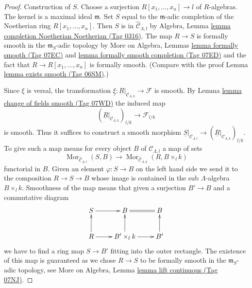 \documentclass{amsart}
\theoremstyle{plain}
\theoremstyle{definition}
\theoremstyle{remark}
\numberwithin{equation}{subsection}
\def\Mor{\mathop{\mathrm{Mor}}\nolimits}
\begin{document}
\begin{proof}
Construction of $S$. Choose a surjection $R[x_1, \ldots, x_n] \to l$
of $R$-algebras. The kernel is a maximal ideal $\mathfrak m$.
Set $S$ equal to the $\mathfrak m$-adic completion of the Noetherian ring
$R[x_1, \ldots, x_n]$. Then $S$ is in $\widehat{\mathcal{C}}_{\Lambda, l}$
by Algebra, Lemma \href{https://stacks.math.columbia.edu/tag/0316}{lemma completion Noetherian Noetherian (Tag 0316)}.
The map $R \to S$ is formally smooth in the $\mathfrak m_S$-adic topology by
More on Algebra, Lemmas
\href{https://stacks.math.columbia.edu/tag/07EC}{lemma formally smooth (Tag 07EC)} and
\href{https://stacks.math.columbia.edu/tag/07ED}{lemma formally smooth completion (Tag 07ED)}
and the fact that $R \to R[x_1, \ldots, x_n]$ is formally smooth.
(Compare with the proof Lemma \href{https://stacks.math.columbia.edu/tag/06SM}{lemma exists smooth (Tag 06SM)}.)

\medskip\noindent
Since $\xi$ is versal, the transformation
$\underline{\xi} : \underline{R}|_{\mathcal{C}_{\Lambda, k}} \to \mathcal{F}$
is smooth. By Lemma \href{https://stacks.math.columbia.edu/tag/07WD}{lemma change of fields smooth (Tag 07WD)} the induced map
$$
(\underline{R}|_{\mathcal{C}_{\Lambda, k}})_{l/k}
\longrightarrow
\mathcal{F}_{l/k}
$$
is smooth. Thus it suffices to construct a smooth morphism
$\underline{S}|_{\mathcal{C}_{\Lambda, l}} \to
(\underline{R}|_{\mathcal{C}_{\Lambda, k}})_{l/k}$.
To give such a map means for every object $B$ of $\mathcal{C}_{\Lambda, l}$
a map of sets
$$
\Mor_{\widehat{\mathcal{C}}_{\Lambda, l}}(S, B)
\longrightarrow
\Mor_{\widehat{\mathcal{C}}_{\Lambda, k}}(R, B \times_l k)
$$
functorial in $B$. Given an element $\varphi : S \to B$
on the left hand side we send it to the composition $R \to S \to B$
whose image is contained in the sub $\Lambda$-algebra $B \times_l k$.
Smoothness of the map means that given a surjection
$B' \to B$ and a commutative diagram
$$
\xymatrix{
S \ar[r] & B \ar@{=}[r] & B \\
R \ar[u] \ar[r] & B' \times_l k \ar[u] \ar[r] & B' \ar[u]
}
$$
we have to find a ring map $S \to B'$ fitting into the outer rectangle.
The existence of this map is guaranteed as we chose $R \to S$ to be
formally smooth in the $\mathfrak m_S$-adic topology, see
More on Algebra, Lemma \href{https://stacks.math.columbia.edu/tag/07NJ}{lemma lift continuous (Tag 07NJ)}.
\end{proof}
\end{document}
